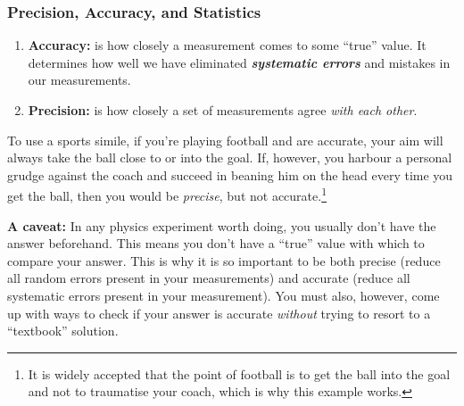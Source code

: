 

\subsubsection{Precision, Accuracy, and Statistics}

\begin{enumerate}
    \item \textbf{Accuracy:} is how closely a measurement comes to some ``true'' value. It determines how well we have eliminated \textbf{\textit{systematic errors}} and mistakes in our measurements.
    \item \textbf{Precision:} is how closely a set of measurements agree \textit{with each other}. %
\end{enumerate}

To use a sports simile, if you're playing football and are accurate, your aim will always take the ball close to or into the goal. If, however, you harbour a personal grudge against the coach and succeed in beaning him on the head every time you get the ball, then you would be \textit{precise}, but not accurate.\footnote{It is widely accepted that the point of football is to get the ball into the goal and not to traumatise your coach, which is why this example works.}

\textbf{A caveat:} In any physics experiment worth doing, you usually don't have the answer beforehand. This means you don't have a ``true'' value with which to compare your answer. This is why it is so important to be both precise (reduce all random errors present in your measurements) and accurate (reduce all systematic errors present in your measurement). You must also, however, come up with ways to check if your answer is accurate \textit{without} trying to resort to a ``textbook'' solution.

